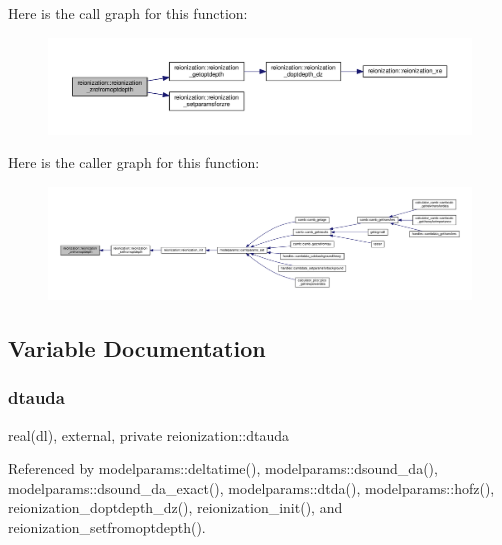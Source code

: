 Here is the call graph for this function\+:
\nopagebreak
\begin{figure}[H]
\begin{center}
\leavevmode
\includegraphics[width=350pt]{namespacereionization_a00f14156cc08a86c4b28e0d21bc7cd2e_cgraph}
\end{center}
\end{figure}
Here is the caller graph for this function\+:
\nopagebreak
\begin{figure}[H]
\begin{center}
\leavevmode
\includegraphics[width=350pt]{namespacereionization_a00f14156cc08a86c4b28e0d21bc7cd2e_icgraph}
\end{center}
\end{figure}


\subsection{Variable Documentation}
\mbox{\label{namespacereionization_a51d090041c100fe2820d487b4f95146d}} 
\subsubsection{\texorpdfstring{dtauda}{dtauda}}
{\footnotesize\ttfamily real(dl), external, private reionization\+::dtauda\hspace{0.3cm}{\ttfamily [private]}}



Referenced by modelparams\+::deltatime(), modelparams\+::dsound\+\_\+da(), modelparams\+::dsound\+\_\+da\+\_\+exact(), modelparams\+::dtda(), modelparams\+::hofz(), reionization\+\_\+doptdepth\+\_\+dz(), reionization\+\_\+init(), and reionization\+\_\+setfromoptdepth().

